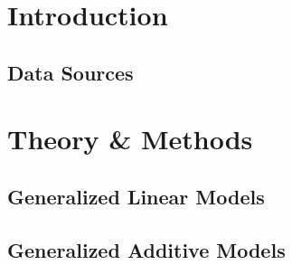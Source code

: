 \documentclass[12pt]{article}
\numberwithin{equation}{section}
\numberwithin{table}{section}
\numberwithin{figure}{section}
\begin{document}
\thispagestyle{empty}	



%

%



%


	
\thispagestyle{empty}
\tableofcontents
\newpage




\newpage

\setcounter{page}{1} 

\section{Introduction} \label{introduction}

\subsection{Data Sources} \label{data_sources}

\clearpage

\section{Theory \& Methods} \label{theory_and_methods}

\subsection{Generalized Linear Models} \label{glm}

\subsection{Generalized Additive Models} \label{gam}
\end{document}
